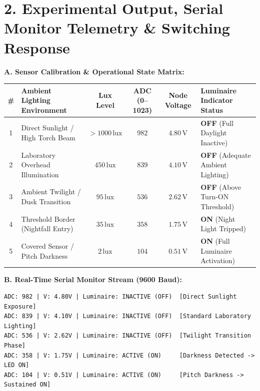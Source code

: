 \documentclass[10pt,a4paper]{article}
\begin{document}
\section*{2. Experimental Output, Serial Monitor Telemetry \& Switching Response}

\noindent
\textbf{A. Sensor Calibration \& Operational State Matrix:}\par\vspace{0.03cm}
{\footnotesize
\setlength{\tabcolsep}{4.5pt}
\renewcommand{\arraystretch}{1.16}
\begin{tabularx}{\textwidth}{|c|p{5.0cm}|c|c|c|>{\raggedright\arraybackslash}X|}
\hline
\textbf{\#} & \textbf{Ambient Lighting Environment} & \textbf{Lux Level} & \textbf{ADC (0--1023)} & \textbf{Node Voltage} & \textbf{Luminaire Indicator Status} \\
\hline
1 & Direct Sunlight / High Torch Beam & $> 1000\,\text{lux}$ & $982$ & $4.80\,\text{V}$ & \textbf{OFF} (Full Daylight Inactive) \\
2 & Laboratory Overhead Illumination & $450\,\text{lux}$ & $839$ & $4.10\,\text{V}$ & \textbf{OFF} (Adequate Ambient Lighting) \\
3 & Ambient Twilight / Dusk Transition & $95\,\text{lux}$ & $536$ & $2.62\,\text{V}$ & \textbf{OFF} (Above Turn-ON Threshold) \\
4 & Threshold Border (Nightfall Entry) & $35\,\text{lux}$ & $358$ & $1.75\,\text{V}$ & \textbf{ON} (Night Light Tripped) \\
5 & Covered Sensor / Pitch Darkness & $2\,\text{lux}$ & $104$ & $0.51\,\text{V}$ & \textbf{ON} (Full Luminaire Activation) \\
\hline
\end{tabularx}
}

\vspace{0.10cm}

\noindent
\textbf{B. Real-Time Serial Monitor Stream (9600 Baud):}\par\vspace{0.03cm}
\begin{lstlisting}[style=bwTerminal]
ADC: 982 | V: 4.80V | Luminaire: INACTIVE (OFF)  [Direct Sunlight Exposure]
ADC: 839 | V: 4.10V | Luminaire: INACTIVE (OFF)  [Standard Laboratory Lighting]
ADC: 536 | V: 2.62V | Luminaire: INACTIVE (OFF)  [Twilight Transition Phase]
ADC: 358 | V: 1.75V | Luminaire: ACTIVE (ON)     [Darkness Detected -> LED ON]
ADC: 104 | V: 0.51V | Luminaire: ACTIVE (ON)     [Pitch Darkness -> Sustained ON]
\end{lstlisting}
\end{document}
